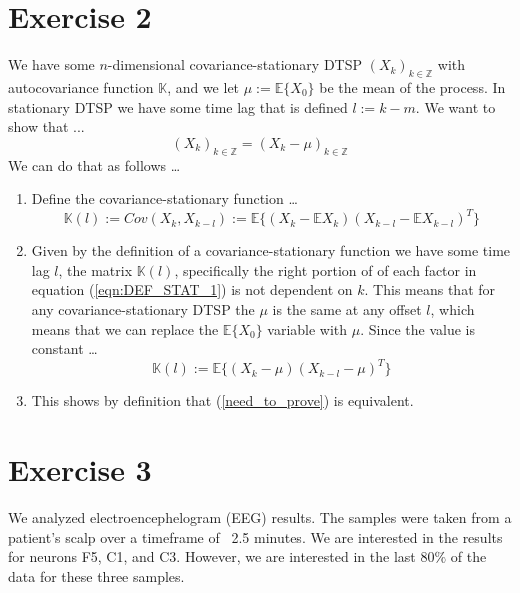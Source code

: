 \documentclass[letter,12pt]{article}
\begin{document}
\section*{Exercise 2}
We have some $n$-dimensional covariance-stationary DTSP $(X_k)_{k\in\mathbb{Z}}$ with autocovariance
function $\mathbb{K}$, and we let $\mu:=\mathbb{E}\{X_0\}$ be the mean of the process. In stationary DTSP
we have some time lag that is defined $l:= k-m$. We want to show that ...
\begin{equation}\label{need_to_prove}
	(X_k)_{k\in\mathbb{Z}} = (X_k - \mu)_{k\in\mathbb{Z}}
\end{equation}
We can do that as follows \dots
\begin{enumerate}[1.]
	\item Define the covariance-stationary function \dots
	\begin{equation}\label{eqn:DEF_STAT_1}
		\mathbb{K}(l) := Cov(X_k,X_{k-l}) := \mathbb{E}\{(X_k-\mathbb{E}X_k)(X_{k-l}-\mathbb{E}X_{k-l})^T\}
	\end{equation}
	\item Given by the definition of a covariance-stationary function we have some time lag $l$, the matrix $\mathbb{K}(l)$, specifically the right portion of 
	of each factor in equation (\ref{eqn:DEF_STAT_1}) is not dependent on $k$. This means that for any covariance-stationary DTSP the $\mu$ is the same at any offset $l$,
	which means that we can replace the $\mathbb{E}\{X_{0}\}$ variable with $\mu$. Since the value is constant \dots
	\begin{equation}
		\mathbb{K}(l):= \mathbb{E}\{(X_k - \mu)(X_{k-l} - \mu)^T\}
	\end{equation}
	\item This shows by definition that (\ref{need_to_prove}) is equivalent.
\end{enumerate}

\section*{Exercise 3}
We analyzed electroencephelogram (EEG) results. The samples were taken from a patient's
scalp over a timeframe of ~2.5 minutes. We are interested in the results for neurons F5, C1, and C3.
However, we are interested in the last $80\%$ of the data for these three samples.
\end{document}
